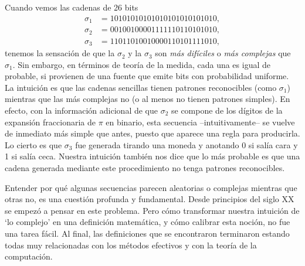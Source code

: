Cuando vemos las cadenas de 26 bits
\begin{align*}
\sigma_1 &= 10101010101010101010101010,\\
\sigma_2 &= 00100100001111110110101010, \\
\sigma_3 &= 11011010010000110101111010,
\end{align*}
tenemos la sensación de que la $\sigma_2$ y la $\sigma_3$
son {\em más difíciles} o {\em más complejas} que $\sigma_1$. Sin embargo, en términos de
teoría de la medida, cada una es igual de probable, si provienen de una fuente que emite bits 
con probabilidad uniforme. 
La intuición es que las cadenas sencillas tienen patrones reconocibles (como $\sigma_1$) mientras
que las más complejas no (o al menos no tienen patrones simples). 
En efecto, con la información adicional de que $\sigma_2$ se compone de los dígitos de 
la expansión fraccionaria de $\pi$ en binario, esta secuencia --intuitivamente-- se vuelve de inmediato más simple que antes, puesto que aparece una regla para producirla. Lo cierto es que $\sigma_3$ fue generada tirando una moneda y anotando 0 si salía cara y 1 si salía ceca. Nuestra intuición también nos dice que lo más probable es que una cadena generada mediante este procedimiento no tenga patrones reconocibles.

Entender por qué
algunas secuencias parecen aleatorias o complejas mientras que otras no, es una cuestión
profunda y fundamental. Desde principios del siglo {\small XX} se
empezó a pensar en este problema. Pero cómo transformar nuestra
intuición de `lo complejo' en una definición matemática, y cómo calibrar esta noción, no fue una tarea fácil. 
Al final, las definiciones que se
encontraron terminaron estando todas muy relacionadas con los métodos efectivos y con la 
teoría de la computación.


